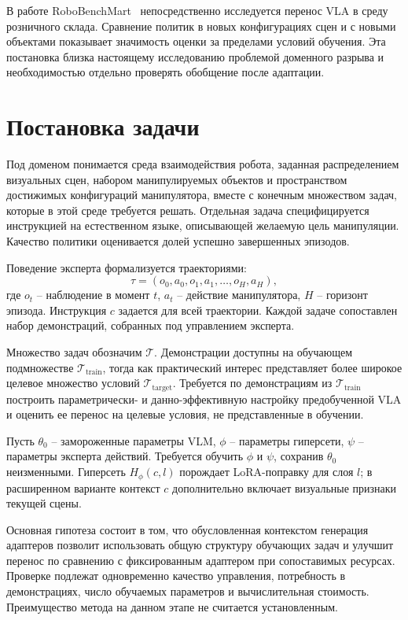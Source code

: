 \documentclass{misisarticle}
\begin{document}
В работе RoboBenchMart~\cite{robobenchmart} непосредственно исследуется перенос VLA в среду розничного склада. Сравнение политик в новых конфигурациях сцен и с новыми объектами показывает значимость оценки за пределами условий обучения. Эта постановка близка настоящему исследованию проблемой доменного разрыва и необходимостью отдельно проверять обобщение после адаптации.

\section{Постановка задачи}

Под доменом понимается среда взаимодействия робота, заданная распределением визуальных сцен, набором манипулируемых объектов и пространством достижимых конфигураций манипулятора, вместе с конечным множеством задач, которые в этой среде требуется решать. Отдельная задача специфицируется инструкцией на естественном языке, описывающей желаемую цель манипуляции. Качество политики оценивается долей успешно завершенных эпизодов.

Поведение эксперта формализуется траекториями:
\begin{equation}
  \tau=(o_0,a_0,o_1,a_1,\ldots,o_H,a_H),
\end{equation}
где $o_t$ -- наблюдение в момент $t$, $a_t$ -- действие манипулятора, $H$ -- горизонт эпизода. Инструкция $c$ задается для всей траектории. Каждой задаче сопоставлен набор демонстраций, собранных под управлением эксперта.

Множество задач обозначим $\mathcal{T}$. Демонстрации доступны на обучающем подмножестве $\mathcal{T}_{\mathrm{train}}$, тогда как практический интерес представляет более широкое целевое множество условий $\mathcal{T}_{\mathrm{target}}$. Требуется по демонстрациям из $\mathcal{T}_{\mathrm{train}}$ построить параметрически- и данно-эффективную настройку предобученной VLA и оценить ее перенос на целевые условия, не представленные в обучении.

Пусть $\theta_0$ -- замороженные параметры VLM, $\phi$ -- параметры гиперсети, $\psi$ -- параметры эксперта действий. Требуется обучить $\phi$ и $\psi$, сохранив $\theta_0$ неизменными. Гиперсеть $H_\phi(c,l)$ порождает LoRA-поправку для слоя $l$; в расширенном варианте контекст $c$ дополнительно включает визуальные признаки текущей сцены.

Основная гипотеза состоит в том, что обусловленная контекстом генерация адаптеров позволит использовать общую структуру обучающих задач и улучшит перенос по сравнению с фиксированным адаптером при сопоставимых ресурсах. Проверке подлежат одновременно качество управления, потребность в демонстрациях, число обучаемых параметров и вычислительная стоимость. Преимущество метода на данном этапе не считается установленным.
\end{document}
